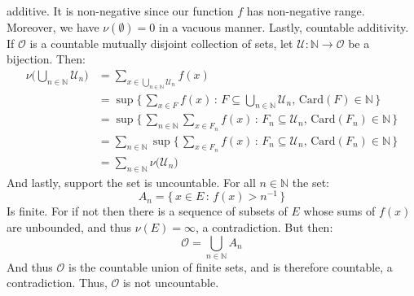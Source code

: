 \documentclass[crop=false,class=article]{standalone}                           %
\begin{document}
\begin{solution}
            additive. It is non-negative since our function $f$ has non-negative
            range. Moreover, we have $\nu(\emptyset)=0$ in a vacuous manner. Lastly,
            countable additivity. If $\mathcal{O}$ is a countable mutually disjoint
            collection of sets, let $\mathcal{U}:\mathbb{N}\rightarrow\mathcal{O}$
            be a bijection. Then:
            \begin{subequations}
                \begin{align}
                    \nu\Big(\bigcup_{n\in\mathbb{N}}\mathcal{U}_{n}\Big)
                    &=\sum_{x\in\bigcup_{n\in\mathbb{N}}\mathcal{U}_{n}}f(x)\\
                    &=\sup\Big\{\,\sum_{x\in{F}}f(x)\,:\,
                        F\subseteq\bigcup_{n\in\mathbb{N}}\mathcal{U}_{n},\,
                        \textrm{Card}(F)\in\mathbb{N}\,\Big\}\\
                    &=\sup\Big\{\,\sum_{n\in\mathbb{N}}\sum_{x\in{F}_{n}}f(x)\,:\,
                        F_{n}\subseteq\mathcal{U}_{n},\,
                        \textrm{Card}(F_{n})\in\mathbb{N}\,\Big\}\\
                    &=\sum_{n\in\mathbb{N}}
                        \sup\Big\{\,\sum_{x\in{F}_{n}}f(x)\,:\,
                            F_{n}\subseteq\mathcal{U}_{n},\,
                            \textrm{Card}(F_{n})\in\mathbb{N}\,\Big\}\\
                    &=\sum_{n\in\mathbb{N}}\nu\big(\mathcal{U}_{n}\big)
                \end{align}
            \end{subequations}
            And lastly, support the set is uncountable. For all $n\in\mathbb{N}$
            the set:
            \begin{equation}
                A_{n}=\{\,x\in{E}\,:\,f(x)>n^{\minus{1}}\,\}
            \end{equation}
            Is finite. For if not then there is a sequence of subsets of $E$ whose
            sums of $f(x)$ are unbounded, and thus $\nu(E)=\infty$, a contradiction.
            But then:
            \begin{equation}
                \mathcal{O}=\bigcup_{n\in\mathbb{N}}A_{n}
            \end{equation}
            And thus $\mathcal{O}$ is the countable union of finite sets, and is
            therefore countable, a contradiction. Thus, $\mathcal{O}$ is not
            uncountable.
        \end{solution}
\end{document}
